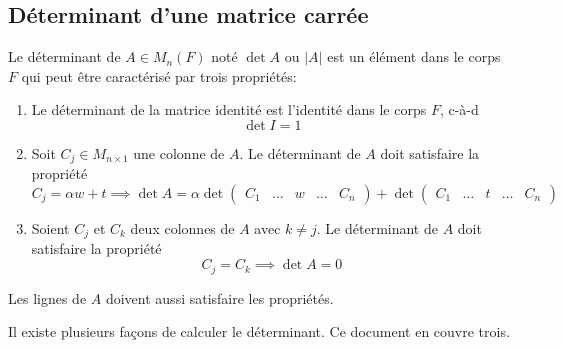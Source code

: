 \subsection{Déterminant d'une matrice carrée}
\begin{definition}
    \label{definition_determinant}
    Le déterminant de $A \in M_{n}(F)$ noté $\det A$ ou $|A|$ est un élément dans le corps $F$ qui peut être caractérisé par trois propriétés:
\begin{enumerate}
    \item Le déterminant de la matrice identité est l'identité dans le corps $F$, c-à-d  \[ \det I = 1 \]
    \item Soit $C_j \in M_{n \times 1}$ une colonne de $A$. Le déterminant de $A$ doit satisfaire la propriété 
    \[ C_j = \alpha w + t \implies \det A = \alpha \det \begin{pmatrix}
                  C_1 & \ldots & w & \ldots & C_n
              \end{pmatrix} + \det \begin{pmatrix}
                  C_1 & \ldots & t & \ldots & C_n
              \end{pmatrix} \]
    \item Soient $C_j$ et $C_k$ deux colonnes de $A$ avec $k \neq j$. Le déterminant de $A$ doit satisfaire la propriété 
    \[ C_j = C_k \implies \det A = 0 \]
\end{enumerate}
\end{definition}
\begin{note}
    Les lignes de $A$ doivent aussi satisfaire les propriétés. 
\end{note}
Il existe plusieurs façons de calculer le déterminant. Ce document en couvre trois.

